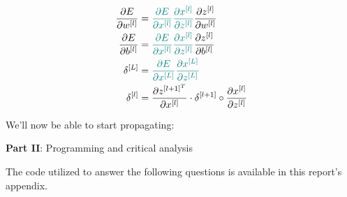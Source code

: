 \documentclass[12pt]{article}
\begin{document}
\begin{enumerate}[leftmargin=\labelsep]
        \begin{align*}
          \frac{\partial E}{\partial w^{[l]}} & = \textcolor{teal}{\frac{\partial E}{\partial x^{[l]}}
            \frac{\partial x^{[l]}}{\partial z^{[l]}}}
          \frac{\partial z^{[l]}}{\partial w^{[l]}}                                                    \\
          \frac{\partial E}{\partial b^{[l]}} & = \textcolor{teal}{\frac{\partial E}{\partial x^{[l]}}
            \frac{\partial x^{[l]}}{\partial z^{[l]}}}
          \frac{\partial z^{[l]}}{\partial b^{[l]}}                                                    \\
          \delta^{[L]}                        & = \textcolor{teal}{\frac{\partial E}{\partial x^{[L]}}
          \frac{\partial x^{[L]}}{\partial z^{[L]}}}                                                   \\
          \delta^{[l]}                        & =
          \frac{\partial z^{[l + 1]^T}}{\partial x^{[l]}} \cdot \delta^{[l + 1]} \circ \frac{\partial x^{[l]}}{\partial z^{[l]}}
        \end{align*}

        We'll now be able to start propagating:


\end{enumerate}

\pagebreak

\center\large{\textbf{Part II}: Programming and critical analysis}

\begin{justify}
  The code utilized to answer the following questions is available in this
  report's appendix.
\end{justify}
\end{document}
